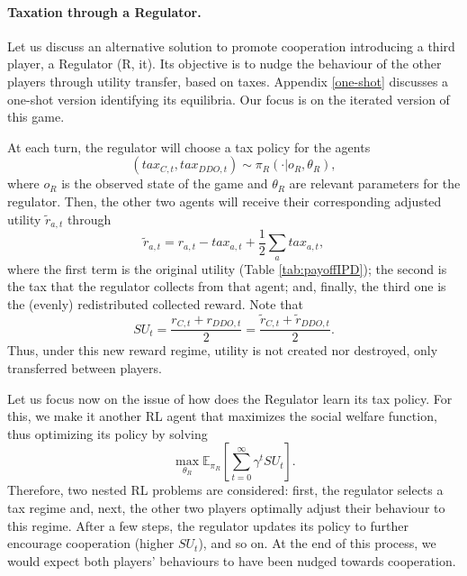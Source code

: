 


\paragraph{Taxation through a Regulator.}\label{sec:regulator}

Let us discuss an alternative solution to promote cooperation introducing a third player, a Regulator (R, it). Its objective is to nudge the behaviour of the other players through utility transfer, based on taxes.   Appendix \ref{one-shot}
discusses a one-shot version identifying its equilibria.
Our focus 
is on the iterated version of this game.

At each turn, the regulator will choose a tax policy for the agents 
$$
(tax_{C, t}, tax_{DDO,t}) \sim \pi_R(\cdot | o_R, \theta_R), 
$$
where $o_R$ is the observed state of the game
and $\theta_R$ are relevant parameters for the regulator. 
Then, the other two agents will receive their corresponding adjusted utility $\tilde{r}_{a,t}$ through 
$$
\tilde{r}_{a,t} = r_{a, t} - tax_{a,t} + \frac{1}{2} \sum_a tax_{a, t},
$$
where the first term is the original utility (Table \ref{tab:payoffIPD});
the second is the tax that the regulator collects 
from that
agent; and, finally, the third one is the (evenly) redistributed collected 
reward.  Note that
$$
SU_t = \frac{r_{C, t} + r_{DDO, t}}{2} = \frac{\tilde{r}_{C, t} + \tilde{r}_{DDO, t}}{2}. 
$$
Thus, under this new reward regime, utility is not created nor destroyed, only transferred between players.

Let us focus now on the issue of how does the Regulator learn its
tax policy. For this, we make it another RL agent that maximizes the social welfare function,
thus optimizing its policy by solving 
$$
\max_{\theta_R} \mathbb{E}_{\pi_R} \left[ \sum_{t=0}^\infty \gamma^t SU_t \right].
$$
Therefore, two nested RL problems are considered: first, 
the regulator selects a tax regime and, next, the other two players optimally adjust their behaviour to this regime. After a few steps, 
the regulator updates its
policy to further encourage cooperation (higher $SU_t$), and so on. At the end of this process, we would expect  both players' behaviours to have been nudged towards cooperation.
 
